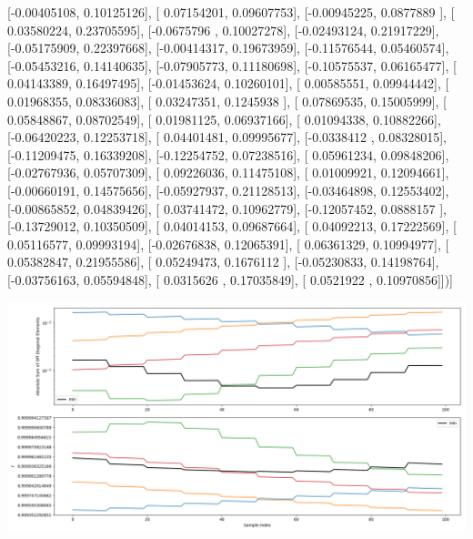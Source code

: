 \documentclass{article}
\begin{document}
       [-0.00405108,  0.10125126],
       [ 0.07154201,  0.09607753],
       [-0.00945225,  0.0877889 ],
       [ 0.03580224,  0.23705595],
       [-0.0675796 ,  0.10027278],
       [-0.02493124,  0.21917229],
       [-0.05175909,  0.22397668],
       [-0.00414317,  0.19673959],
       [-0.11576544,  0.05460574],
       [-0.05453216,  0.14140635],
       [-0.07905773,  0.11180698],
       [-0.10575537,  0.06165477],
       [ 0.04143389,  0.16497495],
       [-0.01453624,  0.10260101],
       [ 0.00585551,  0.09944442],
       [ 0.01968355,  0.08336083],
       [ 0.03247351,  0.1245938 ],
       [ 0.07869535,  0.15005999],
       [ 0.05848867,  0.08702549],
       [ 0.01981125,  0.06937166],
       [ 0.01094338,  0.10882266],
       [-0.06420223,  0.12253718],
       [ 0.04401481,  0.09995677],
       [-0.0338412 ,  0.08328015],
       [-0.11209475,  0.16339208],
       [-0.12254752,  0.07238516],
       [ 0.05961234,  0.09848206],
       [-0.02767936,  0.05707309],
       [ 0.09226036,  0.11475108],
       [ 0.01009921,  0.12094661],
       [-0.00660191,  0.14575656],
       [-0.05927937,  0.21128513],
       [-0.03464898,  0.12553402],
       [-0.00865852,  0.04839426],
       [ 0.03741472,  0.10962779],
       [-0.12057452,  0.0888157 ],
       [-0.13729012,  0.10350509],
       [ 0.04014153,  0.09687664],
       [ 0.04092213,  0.17222569],
       [ 0.05116577,  0.09993194],
       [-0.02676838,  0.12065391],
       [ 0.06361329,  0.10994977],
       [ 0.05382847,  0.21955586],
       [ 0.05249473,  0.1676112 ],
       [-0.05230833,  0.14198764],
       [-0.03756163,  0.05594848],
       [ 0.0315626 ,  0.17035849],
       [ 0.0521922 ,  0.10970856]])]
\begin{center}
\includegraphics[scale=.9]{report_pickled_controls142/control_dpn_all.png}

\end{center}
\end{document}
